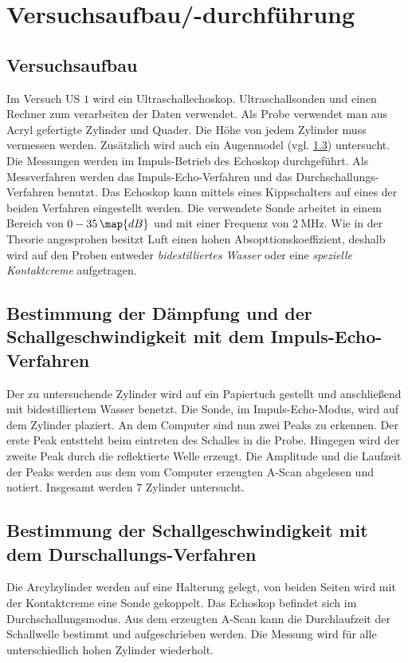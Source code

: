 \section{Versuchsaufbau/-durchführung}

\subsection{Versuchsaufbau}
Im Versuch US $1$ wird ein Ultraschallechoskop. Ultraschallsonden und einen Rechner
zum verarbeiten der Daten verwendet.
Als Probe verwendet man aus Acryl gefertigte Zylinder und Quader.
Die Höhe von jedem Zylinder muss vermessen werden. Zusätzlich wird auch
ein Augenmodel (vgl. \ref{}) untersucht.
Die Messungen werden im Impuls-Betrieb des Echoskop durchgeführt. Als Messverfahren werden
das Impuls-Echo-Verfahren und das Durchschallungs-Verfahren benutzt. Das Echoskop kann mittels
eines Kippschalters auf eines der beiden Verfahren eingestellt werden.
Die verwendete Sonde arbeitet in einem Bereich von $0-35\,\map{dB}$ und mit einer
Frequenz von $\SI{2}{\mega\hertz}$.
Wie in der Theorie angesprohen besitzt Luft einen hohen Absopttionskoeffizient, deshalb wird
auf den Proben entweder \emph{bidestilliertes Wasser} oder eine \emph{spezielle Kontaktcreme}
aufgetragen.

\subsection{Bestimmung der Dämpfung und der Schallgeschwindigkeit mit dem Impuls-Echo-Verfahren}
Der zu untersuchende Zylinder wird auf ein Papiertuch gestellt und anschließend
mit bidestilliertem Wasser benetzt. Die Sonde, im Impuls-Echo-Modus, wird auf dem
Zylinder plaziert. An dem Computer sind nun zwei Peaks zu erkennen. Der erste Peak
entstteht beim eintreten des Schalles in die Probe. Hingegen wird der zweite Peak
durch die reflektierte Welle erzeugt. Die Amplitude und die Laufzeit der Peaks
werden aus dem vom Computer erzeugten A-Scan abgelesen und notiert.
Insgesamt werden $7$ Zylinder untersucht.

\subsection{Bestimmung der Schallgeschwindigkeit mit dem Durschallungs-Verfahren}

Die Arcylzylinder werden auf eine Halterung gelegt, von beiden Seiten wird
mit der Kontaktcreme eine Sonde gekoppelt. Das Echoskop befindet sich im
Durchschallungsmodus. Aus dem erzeugten A-Scan kann die Durchlaufzeit der
Schallwelle bestimmt und aufgeschrieben werden. Die Messung wird für alle unterschiedlich
hohen Zylinder wiederholt.

